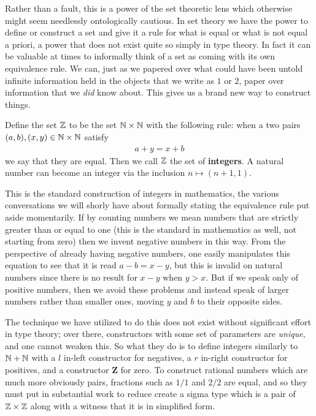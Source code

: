 \documentclass[11pt]{article}
\begin{document}
Rather than a fault, this is a power of the set theoretic lens which otherwise might seem needlessly ontologically cautious. In set theory we have the power to define or construct a set and give it a rule for what is equal or what is not equal a priori, a power that does not exist quite so simply in type theory. In fact it can be valuable at times to informally think of a set as coming with its own equivalence rule. We can, just as we papered over what could have been untold infinite information held in the objects that we write as $1$ or $2$, paper over information that we \emph{did} know about. This gives us a brand new way to construct things.

\begin{definition}[Integers]
Define the set $\mathbb{Z}$ to be the set $\mathbb{N} \times \mathbb{N}$ with the following rule: when a two pairs $(a,b),(x,y) \in \mathbb{N} \times \mathbb{N}$ satisfy \begin{gather*}
a + y = x + b
\end{gather*}
we say that they are equal. Then we call $\mathbb{Z}$ the set of \textbf{integers}. A natural number can become an integer via the inclusion $n \mapsto (n+1,1)$.
\end{definition}

This is the standard construction of integers in mathematics, the various conversations we will shorly have about formally stating the equivalence rule put aside momentarily. If by counting numbers we mean numbers that are strictly greater than or equal to one (this is the standard in mathematics as well, not starting from zero) then we invent negative numbers in this way. From the perspective of already having negative numbers, one easily manipulates this equation to see that it is read $a - b = x - y$, but this is invalid on natural numbers since there is no result for $x-y$ when $y > x$. But if we speak only of positive numbers, then we avoid these problems and instead speak of larger numbers rather than smaller ones, moving $y$ and $b$ to their opposite sides.

The technique we have utilized to do this does not exist without significant effort in type theory; over there, constructors with some set of parameters are \emph{unique}, and one cannot weaken this. So what they do is to define integers similarly to $\mathbb{N} + \mathbb{N}$ with a $l$ in-left constructor for negatives, a $r$ in-right constructor for positives, and a constructor $\mathbf{Z}$ for zero. To construct rational numbers which are much more obviously pairs, fractions such as $1/1$ and $2/2$ are equal, and so they must put in substantial work to reduce create a sigma type which is a pair of $\mathbb{Z} \times \mathbb{Z}$ along with a witness that it is in simplified form.
\end{document}
